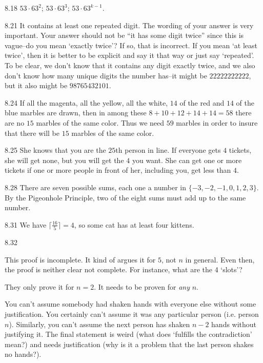 \begin{Answer}{8.18}
$53\cdot 63^2$;
$53\cdot 63^3$;
$53\cdot 63^{k-1}$.
\end{Answer}
\begin{Answer}{8.21}
It contains at least one repeated digit.  The wording of your answer is very
important.  Your answer should not be ``it has some digit twice'' since this
is vague--do you mean `exactly twice'?  If so, that is incorrect.  If you mean
`at least twice', then it is better to be explicit and say it that way or just say
`repeated'.  To be clear, we don't know that it contains any digit exactly twice,
and we also don't know how many unique digits the number has--it might be $22222222222$,
but it also might be $98765432101$.
\end{Answer}
\begin{Answer}{8.24}
If all
the magenta, all the yellow, all the white, $14$ of the red and $14$
of the blue marbles are drawn, then in among these $8 + 10 + 12 + 14
+ 14 = 58$ there are no $15$ marbles of the same color. Thus we need
$59$ marbles in order to insure that there will be $15$ marbles of
the same color.
\end{Answer}
\begin{Answer}{8.25}
She knows that you are the $25$th person in line.  If everyone gets $4$ tickets,
she will get none, but you will get the $4$ you want.  She can get one or more
tickets if one or more people in front of her, including you, get less than $4$.
\end{Answer}
\begin{Answer}{8.28}
There are seven possible sums, each one a number in
$\{-3,-2,-1,0,1,2,3\}$. By the Pigeonhole Principle, two of the
eight sums must add up to the same number.
\end{Answer}
\begin{Answer}{8.31}
We have $ \lceil{\frac{16}{5}}\rceil = 4$, so some cat has at least four kittens.
\end{Answer}
\begin{Answer}{8.32}
\begin{pfevalenum}
\item
This proof is incomplete.  It kind of argues it for $5$, not $n$ in general.
Even then, the proof is neither clear not complete.  For instance, what are
the 4 `slots'?
\item
They only prove it for $n=2$.  It needs to be proven for {\em any} $n$.
\item
You can't assume somebody had shaken hands with everyone else without some justification.
You certainly can't assume it was any particular person (i.e. person $n$).
Similarly, you can't assume the next person has shaken $n-2$ hands without justifying it.
The final statement is weird (what does `fulfills the contradiction' mean?)
and needs justification (why is it a problem that the last person shakes no hands?).
\end{pfevalenum}
\end{Answer}
